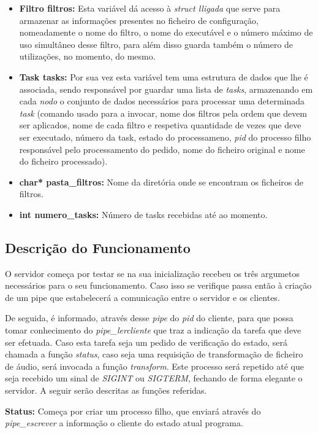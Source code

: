 \documentclass[11pt,a4paper]{report}
\begin{document}
\begin{itemize}
\item \textbf{Filtro filtros: } Esta variável dá acesso à \emph{struct lligada} que serve para armazenar as informações presentes no ficheiro de configuração, nomeadamente  o nome do filtro, o nome do executável e o número máximo de uso simultâneo desse filtro, para além disso guarda também o número de utilizações, no momento, do mesmo.
\item \textbf{Task tasks: } Por sua vez esta variável tem uma estrutura de dados que lhe é associada, sendo responsável por guardar uma lista de \emph{tasks}, armazenando em cada \emph{nodo} o conjunto de dados necessários para processar uma determinada \emph{task} (comando usado para a invocar, nome dos filtros pela ordem que devem ser aplicados, nome de cada filtro e respetiva quantidade de vezes que deve ser executado, número da task, estado do processameno, \emph{pid} do processo filho responsável pelo processamento do pedido, nome do ficheiro original e nome do ficheiro processado).
\item \textbf{char* pasta\_filtros: } Nome da diretória onde se encontram os ficheiros de filtros. 
\item \textbf{int numero\_tasks:} Número de tasks recebidas até ao momento.
\end{itemize}

\subsection{Descrição do Funcionamento}

O servidor começa por testar se na sua inicialização recebeu os três argumetos necessários para o seu funcionamento. Caso isso se verifique passa então à criação de um pipe que estabelecerá a comunicação entre o servidor e os clientes.

De seguida, é informado, através desse \emph{pipe} do \emph{pid} do cliente, para que possa tomar conhecimento do \emph{pipe\_lercliente} que traz a indicação da tarefa que deve ser efetuada. Caso esta tarefa seja um pedido de verificação do estado, será chamada a função \emph{status}, caso seja uma requisição de transformação de ficheiro de áudio, será invocada a função \emph{transform}. Este processo será repetido até que seja recebido um sinal de \emph{SIGINT} ou \emph{SIGTERM}, fechando de forma elegante o servidor. A seguir serão descritas as funções referidas.

\textbf{Status: } Começa por criar um processo filho, que enviará através do \emph{pipe\_escrever} a informação o cliente do estado atual programa.
 
\end{document}
